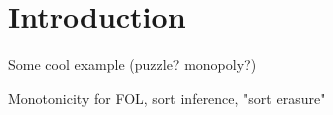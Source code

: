 
\section{Introduction}

Some cool example (puzzle? monopoly?)

Monotonicity for FOL, sort inference, "sort erasure"



